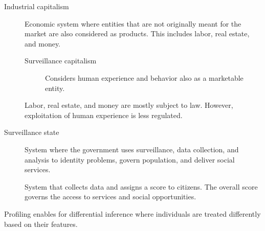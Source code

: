 \begin{description}
    \item[Industrial capitalism] 
        Economic system where entities that are not originally meant for the market are also considered as products. This includes labor, real estate, and money.

        \begin{description}
            \item[Surveillance capitalism] 
                Considers human experience and behavior also as a marketable entity.
        \end{description}

        \begin{remark}
            Labor, real estate, and money are mostly subject to law. However, exploitation of human experience is less regulated.
        \end{remark}

    \item[Surveillance state] 
        System where the government uses surveillance, data collection, and analysis to identity problems, govern population, and deliver social services.

        \begin{example}
            System that collects data and assigns a score to citizens. The overall score governs the access to services and social opportunities.
        \end{example}
\end{description}

\begin{remark}
    Profiling enables for differential inference where individuals are treated differently based on their features.
\end{remark}